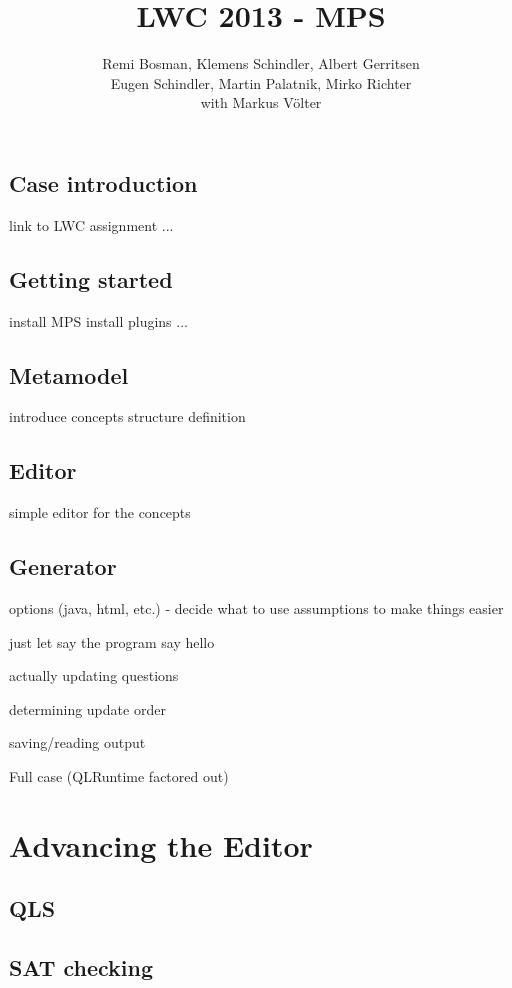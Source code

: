 \documentclass[12pt]{report}
\begin{document}
\title{LWC 2013 - MPS}
\author{Remi Bosman, Klemens Schindler, Albert Gerritsen\\
Eugen Schindler, Martin Palatnik, Mirko Richter\\
with Markus V\"olter}

\maketitle

\section{Case introduction}
link to LWC assignment
...

\section{Getting started}
install MPS
install plugins
...

\section{Metamodel}
introduce concepts
structure definition

\section{Editor}
simple editor for the concepts

\section{Generator}
options (java, html, etc.) - decide what to use
assumptions to make things easier

just let say the program say hello

actually updating questions

determining update order

saving/reading output

Full case (QLRuntime factored out)

\chapter{Advancing the Editor}

\section{QLS}

\section{SAT checking}
\end{document}
